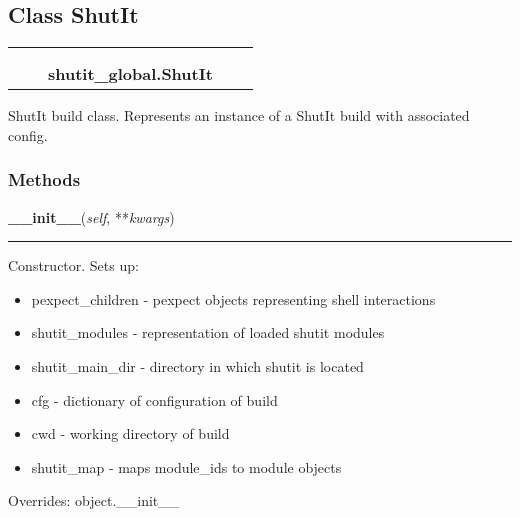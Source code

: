 \subsection{Class ShutIt}

    \label{shutit_global:ShutIt}
\begin{tabular}{cccccc}
\multicolumn{2}{r}{\settowidth{\BCL}{object}\multirow{2}{\BCL}{object}}
&&
  \\\cline{3-3}
  &&\multicolumn{1}{c|}{}
&&
  \\
&&\multicolumn{2}{l}{\textbf{shutit\_global.ShutIt}}
\end{tabular}

ShutIt build class. Represents an instance of a ShutIt build with 
associated config.



  \subsubsection{Methods}

    \vspace{0.5ex}

\hspace{.8\funcindent}\begin{boxedminipage}{\funcwidth}

    \raggedright \textbf{\_\_init\_\_}(\textit{self}, **\textit{kwargs})

    \vspace{-1.5ex}

    \rule{\textwidth}{0.5\fboxrule}
\setlength{\parskip}{2ex}
    Constructor. Sets up:

    \begin{itemize}
    \setlength{\parskip}{0.6ex}
      \item pexpect\_children   - pexpect objects representing shell 
        interactions

      \item shutit\_modules     - representation of loaded shutit modules

      \item shutit\_main\_dir    - directory in which shutit is located

      \item cfg                - dictionary of configuration of build

      \item cwd                - working directory of build

      \item shutit\_map         - maps module\_ids to module objects

    \end{itemize}

\setlength{\parskip}{1ex}
      Overrides: object.\_\_init\_\_

    \end{boxedminipage}


